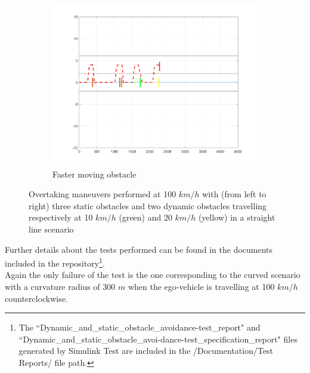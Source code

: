 \begin{figure}[H]
\begin{subfigure}{.33\textwidth}
    \end{subfigure}
    \begin{subfigure}{.33\textwidth}
    \centering
    \includegraphics[width=1.1\textwidth,keepaspectratio]{Figures/overtake_multiple_right.png}
    \caption{Faster moving obstacle}
    \label{subfig:multiple_right}
    \end{subfigure}
    \caption{Overtaking maneuvers performed at 100 $km/h$ with (from left to right) three static obstacles and two dynamic obstacles travelling respectively at 10 $km/h$ (green) and 20 $km/h$ (yellow) in a straight line scenario}
    \label{fig:static_and_dynamic_obstacle_avoidance}
\end{figure}

Further details about the tests performed can be found in the documents included in the repository\footnote{The ``Dynamic\_and\_static\_obstacle\_avoidance-test\_report" and ``Dynamic\_and\_static\_obstacle\_avoi-dance-test\_specification\_report" files generated by Simulink Test are included in the /Documentation/Test Reports/ file path.}.\\
Again the only failure of the test is the one corresponding to the curved scenario with a curvature radius of 300 $m$ when the ego-vehicle is travelling at 100 $km/h$ counterclockwise.







